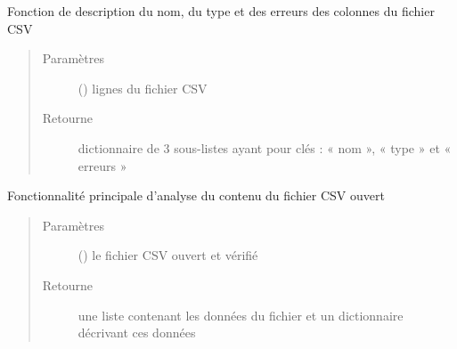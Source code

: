 \documentclass[letterpaper,10pt,openany,oneside,french]{sphinxmanual}
\begin{document}

\begin{fulllineitems}
\label{\detokenize{analyseContenuFichier:chargement_des_donnees.analyseContenuFichier.removeDateSuffix}}
\end{fulllineitems}


\begin{fulllineitems}
\label{\detokenize{analyseContenuFichier:chargement_des_donnees.analyseContenuFichier.descriptionColonnes}}
Fonction de description du nom, du type et des erreurs des colonnes du fichier CSV
\begin{quote}\begin{description}
\item[{Paramètres}] \leavevmode
{} () \textendash{} lignes du fichier CSV

\item[{Retourne}] \leavevmode
dictionnaire de 3 sous-listes ayant pour clés : « nom », « type » et « erreurs »

\end{description}\end{quote}

\end{fulllineitems}


\begin{fulllineitems}
\label{\detokenize{analyseContenuFichier:chargement_des_donnees.analyseContenuFichier.analyseFichier}}
Fonctionnalité principale d’analyse du contenu du fichier CSV ouvert
\begin{quote}\begin{description}
\item[{Paramètres}] \leavevmode
{} () \textendash{} le fichier CSV ouvert et vérifié

\item[{Retourne}] \leavevmode
une liste contenant les données du fichier et un dictionnaire décrivant ces données

\end{description}\end{quote}

\end{fulllineitems}
\end{document}
